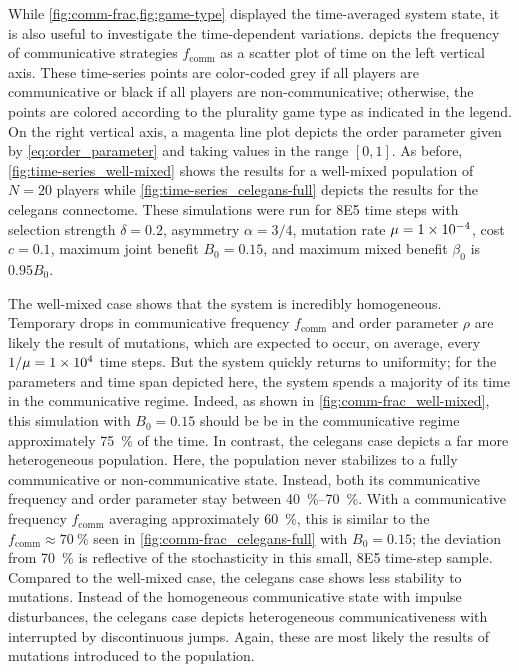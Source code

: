 \documentclass[pdflatex,lineno,referee,sn-mathphys-ay]{sn-jnl}
\begin{document}
While \cref{fig:comm-frac,fig:game-type} displayed
the time-averaged system state,
it is also useful to investigate the time-dependent variations.
 depicts the frequency
of communicative strategies $f_{\text{comm}}$
as a scatter plot of time on the left vertical axis.
These time-series points are color-coded
grey if all players are communicative or
black if all players are non-communicative;
otherwise, the points are colored according
to the plurality game type as indicated in the legend.
On the right vertical axis,
a magenta line plot depicts the order parameter
given by \cref{eq:order_parameter} and
taking values in the range $[0,1]$.
As before, \cref{fig:time-series_well-mixed} shows the results
for a well-mixed population of $N=20$ players
while \cref{fig:time-series_celegans-full} depicts the results
for the \gls{celegans} connectome.
These simulations were run
for \num{8E5} time steps with
selection strength $\delta = 0.2$,
asymmetry $\alpha = 3/4$,
mutation rate $\mu=\num{1E-4}$,
cost $c = \num{0.1}$,
maximum joint benefit $B_0 = 0.15$,
and maximum mixed benefit $\beta_0$ is $\num{0.95} B_0$.

The  well-mixed case
shows that the system is incredibly homogeneous.
Temporary drops in communicative frequency $f_{\text{comm}}$
and order parameter $\rho$ are likely the result of mutations,
which are expected to occur, on average, every $1/\mu = \num{1E4}$ time steps.
But the system quickly returns to uniformity;
for the parameters and time span depicted here,
the system spends a majority of its time in the communicative regime.
Indeed, as shown in \cref{fig:comm-frac_well-mixed},
this simulation with $B_0 = 0.15$ should be be in the communicative regime
approximately \SI{75}{\percent} of the time.
In contrast, the  \gls{celegans} case
depicts a far more heterogeneous population.
Here, the population never stabilizes
to a fully communicative or non-communicative state.
Instead, both its communicative frequency and order parameter
stay between \SIrange{40}{70}{\percent}.
With a communicative frequency $f_{\text{comm}}$ averaging approximately \SI{60}{\percent},
this is similar to the $f_{\text{comm}} \approx \SI{70}{\percent}$ seen
in \cref{fig:comm-frac_celegans-full} with $B_0 = 0.15$;
the deviation from \SI{70}{\percent} is reflective of the
stochasticity in this small, \num{8E5} time-step sample.
Compared to the  well-mixed case,
the \gls{celegans} case shows less stability to mutations.
Instead of the homogeneous communicative state with impulse disturbances,
the \gls{celegans} case depicts heterogeneous communicativeness
with interrupted by discontinuous jumps.
Again, these are most likely the results of mutations introduced
to the population.
\end{document}
